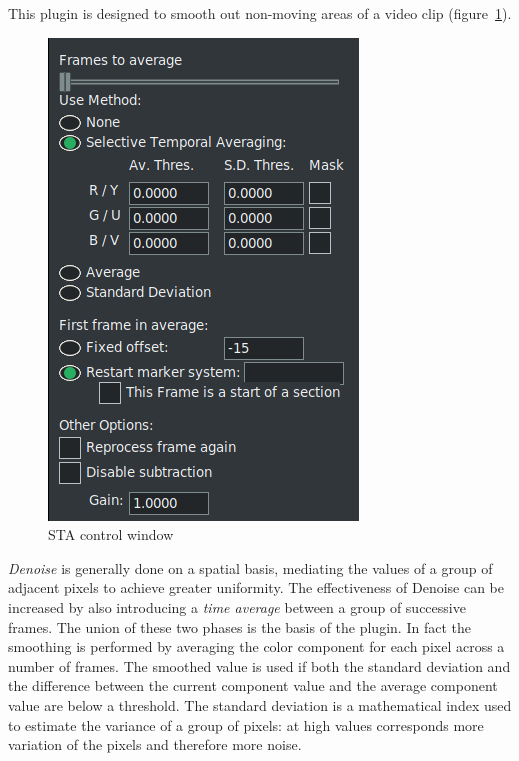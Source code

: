 This plugin is designed to smooth out non-moving areas of a video clip (figure~\ref{fig:staveraging}).
\vspace{2ex}
\begin{figure} 
    \includegraphics[width=0.9\linewidth]{images/staveraging.png}
    \caption{STA control window}
    \label{fig:staveraging}
\end{figure}

\textit{Denoise} is generally done on a spatial basis, mediating the values of a group of adjacent pixels to achieve greater uniformity. The effectiveness of Denoise can be increased by also introducing a \textit{time average} between a group of successive frames. The union of these two phases is the basis of the plugin. In fact the smoothing is performed by averaging the color component for each pixel across a number of frames. The smoothed value is used if both the standard deviation and the difference between the current component value and the average component value are below a threshold. The standard deviation is a mathematical index used to estimate the variance of a group of pixels: at high values corresponds more variation of the pixels and therefore more noise.

